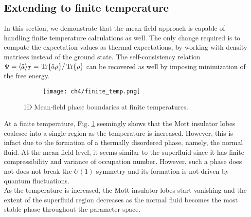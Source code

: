 \subsection{Extending to finite temperature}
In this section, we demonstrate that the mean-field approach is capable of handling finite temperature calculations as well. The only change required is to compute the expectation values as thermal expectations, by working with density matrices instead of the ground state. The self-consistency relation $\Psi = \langle \hat{a} \rangle_T = \Tr{\hat{a}\rho}/\Tr{\rho}$ can be recovered as well by imposing minimization of the free energy. 
\begin{figure}[!htb]
    \centering
    \begin{subfigure}[b]{\textwidth}  %
        \centering
        \texttt{[image: ch4/finite\_temp.png]}
    \end{subfigure}
    \caption{1D Mean-field phase boundaries at finite temperatures.}
    \label{fig:mft_temp}
\end{figure}
\FloatBarrier \!\!\!\!\!\!\!\!\!\!\!

At a finite temperature, Fig. \ref{fig:mft_temp} seemingly shows that the Mott insulator lobes coalesce into a single region as the temperature is increased. However, this is infact due to the formation of a thermally disordered phase, namely, the normal fluid. At the mean field level, it seems similar to the superfluid since it has finite compressibility and variance of occupation number. However, such a phase does not does not break the $U(1)$ symmetry and its formation is not driven by quantum fluctuations. 
\vspace{0.5cm}\\
As the temperature is increased, the Mott insulator lobes start vanishing and the extent of the superfluid region decreases as the normal fluid becomes the most stable phase throughout the parameter space. 

